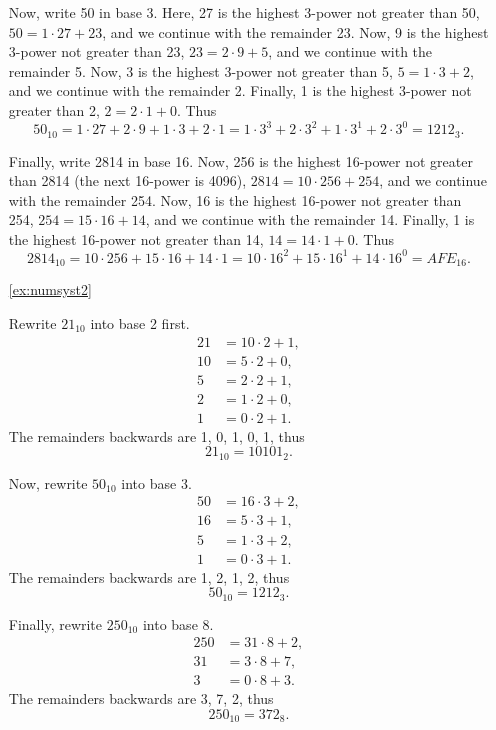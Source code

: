 \begin{enumerate}
Now, write 50 in base 3. 
Here, 27 is the highest 3-power not greater than 50, 
$50 = 1 \cdot 27 + 23$, 
and we continue with the remainder 23. 
Now, 9 is the highest 3-power not greater than 23, 
$23 = 2\cdot 9 + 5$, 
and we continue with the remainder 5. 
Now, 3 is the highest 3-power not greater than 5, 
$5 = 1\cdot 3 + 2$, 
and we continue with the remainder 2. 
Finally, 1 is the highest 3-power not greater than 2, 
$2 = 2 \cdot 1 + 0$. 
Thus 
\[
50_{10} = 1 \cdot 27 + 2 \cdot 9 + 1 \cdot 3 + 2\cdot 1 = 1 \cdot 3^3 + 2 \cdot 3^2 + 1 \cdot 3^1 + 2 \cdot 3^0  = 1212_3. 
\]

Finally, write 2814 in base 16. 
Now, 256 is the highest 16-power not greater than 2814 
(the next 16-power is 4096), 
$2814 = 10 \cdot 256 + 254$, 
and we continue with the remainder 254. 
Now, 16 is the highest 16-power not greater than 254, 
$254 = 15\cdot 16 + 14$, 
and we continue with the remainder 14. 
Finally, 1 is the highest 16-power not greater than 14, 
$14 = 14 \cdot 1 + 0$. 
Thus 
\[
2814_{10} = 10 \cdot 256 + 15 \cdot 16 + 14 \cdot 1 = 10 \cdot 16^2 + 15 \cdot 16^1 + 14 \cdot 16^0   = AFE_{16}. 
\]


\item[\ref{ex:numsyst2}]

Rewrite $21_{10}$ into base 2 first. 
\begin{align*}
21 &= 10 \cdot 2 + 1, \\
10 &= 5 \cdot 2 + 0, \\
5 &= 2 \cdot 2 + 1, \\
2 &= 1 \cdot 2 + 0, \\
1 &= 0 \cdot 2 + 1. 
\end{align*}
The remainders backwards are 1, 0, 1, 0, 1, thus 
\[
21_{10} = 10101_{2}. 
\]

Now, rewrite $50_{10}$ into base 3. 
\begin{align*}
50 &= 16 \cdot 3 + 2, \\
16 &= 5 \cdot 3 + 1, \\
5 &= 1 \cdot 3 + 2, \\
1 &= 0 \cdot 3 + 1. 
\end{align*}
The remainders backwards are 1, 2, 1, 2, thus 
\[
50_{10} = 1212_{3}. 
\]

Finally, rewrite $250_{10}$ into base 8. 
\begin{align*}
250 &= 31 \cdot 8 + 2, \\
31 &= 3 \cdot 8 + 7, \\
3 &= 0 \cdot 8 + 3. 
\end{align*}
The remainders backwards are 3, 7, 2, thus 
\[
250_{10} = 372_{8}. 
\]


\end{enumerate}
